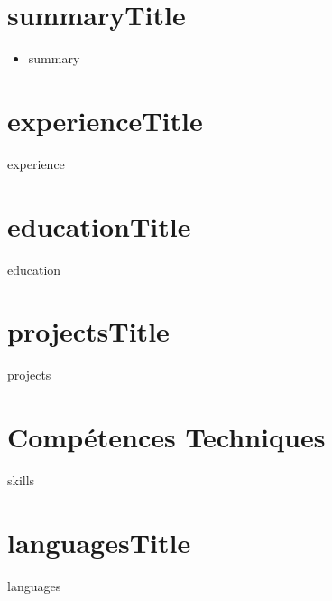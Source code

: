 \documentclass[11pt,a4paper,sans,french]{moderncv}
\begin{document}
\makecvtitle

\section{{{summaryTitle}}}
\begin{itemize}[leftmargin=0.18in, label={}, itemsep=1.2pt, topsep=1.5pt, parsep=0pt]
\item \footnotesize {{summary}}
\end{itemize}\vspace{-3pt}

\section{{{experienceTitle}}}
{{experience}}\vspace{-2pt}

\section{{{educationTitle}}}
{{education}}\vspace{-1pt}

\section{{{projectsTitle}}}
{{projects}}\vspace{-3pt}

\section{Compétences Techniques}
{{skills}}\vspace{-3pt}

\section{{{languagesTitle}}}
{{languages}}
\end{document}

